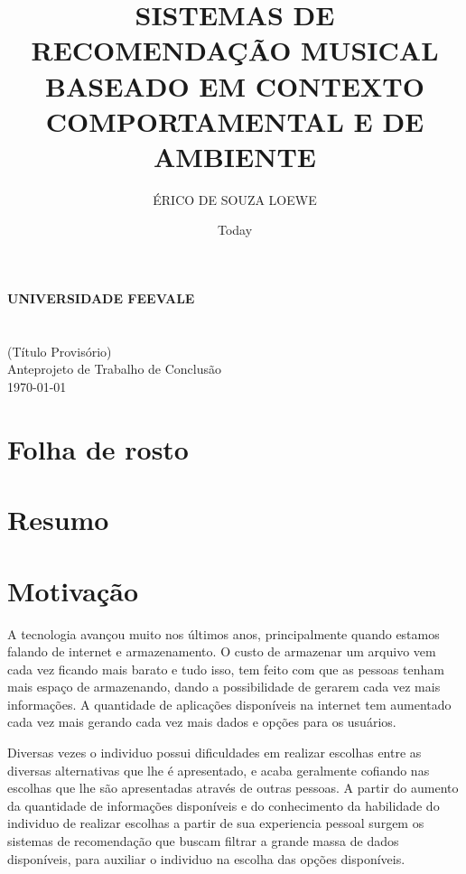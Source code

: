 \documentclass{article}
\title{SISTEMAS DE RECOMENDAÇÃO MUSICAL BASEADO EM CONTEXTO COMPORTAMENTAL E DE AMBIENTE}
\author{ÉRICO DE SOUZA LOEWE}
\date{Today}
\begin{document}
\makeatletter
\begin{titlepage}
   \begin{center}
      \large\textbf{
      UNIVERSIDADE FEEVALE\\
      \@author\\
      \@title\\
      }
      (Título Provisório)\\
      Anteprojeto de Trabalho de Conclusão\\
      \today
   \end{center}
\end{titlepage}
\makeatother

\section{Folha de rosto}
\newpage

\section{Resumo}
\newpage

\section{Motivação}

A tecnologia avançou muito nos últimos anos, principalmente quando estamos falando de internet e armazenamento. \cite{muraro2009avanccos} 
O custo de armazenar um arquivo vem cada vez ficando mais barato e tudo isso, tem feito com que as pessoas tenham mais espaço de armazenando, dando a possibilidade de gerarem cada vez mais informações. \cite{ufc2020amagnetorresistencia} 
A quantidade de aplicações disponíveis na internet tem aumentado cada vez mais gerando cada vez mais dados e opções para os usuários. %

Diversas vezes o individuo possui dificuldades em realizar escolhas entre as diversas alternativas que lhe é apresentado, e acaba geralmente cofiando nas escolhas que lhe são apresentadas através de outras pessoas. \cite{resnick1997recommender} A partir do aumento da quantidade de informações disponíveis e do conhecimento da habilidade do individuo de realizar escolhas a partir de sua experiencia pessoal surgem os sistemas de recomendação que buscam filtrar a grande massa de dados disponíveis, para auxiliar o individuo na escolha das opções disponíveis.
\end{document}
